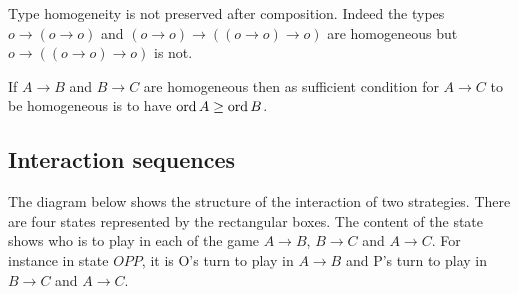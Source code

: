 Type homogeneity is not preserved after composition. Indeed the types  $o \longrightarrow (o \rightarrow o)$ and $(o \rightarrow o) \longrightarrow \left((o \rightarrow o) \rightarrow o \right)$ are homogeneous
but $o \longrightarrow \left((o \rightarrow o) \rightarrow o\right)$ is not.

If $A\rightarrow B$ and $B \rightarrow C$ are homogeneous then 
as sufficient condition for $A\rightarrow C$ to be homogeneous is to have $\mathop{\mathrm{ord}}{A} \geq \mathop{\mathrm{ord}}{B}$.

\subsection{Interaction sequences}

The diagram below shows the structure of the interaction of two strategies. There are four states represented by the rectangular boxes. The content of the state shows who is to play in each of the game $A\rightarrow B$, $B\rightarrow C$ and $A\rightarrow C$.
For instance in state $OPP$, it is O's turn to play in 
$A\rightarrow B$ and P's turn to play in $B\rightarrow C$ and $A\rightarrow C$.

